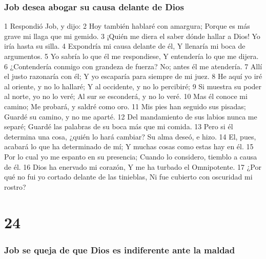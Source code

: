 \subsection*{Job desea abogar su causa delante de Dios}  

1 Respondió Job, y dijo:  
2 Hoy también hablaré con amargura;  
Porque es más grave mi llaga que mi gemido.  
3 ¡Quién me diera el saber dónde hallar a Dios!  
Yo iría hasta su silla.  
4 Expondría mi causa delante de él,  
Y llenaría mi boca de argumentos.  
5 Yo sabría lo que él me respondiese,  
Y entendería lo que me dijera.  
6 ¿Contendería conmigo con grandeza de fuerza? 
No; antes él me atendería.  
7 Allí el justo razonaría con él;  
Y yo escaparía para siempre de mi juez.  
8 He aquí yo iré al oriente, y no lo hallaré;  
Y al occidente, y no lo percibiré;  
9 Si muestra su poder al norte, yo no lo veré;  
Al sur se esconderá, y no lo veré.  
10 Mas él conoce mi camino;  
Me probará, y saldré como oro.  
11 Mis pies han seguido sus pisadas;  
Guardé su camino, y no me aparté.  
12 Del mandamiento de sus labios nunca me separé;  
Guardé las palabras de su boca más que mi comida.  
13 Pero si él determina una cosa, ¿quién lo hará cambiar?  
Su alma deseó, e hizo.  
14 El, pues, acabará lo que ha determinado de mí;  
Y muchas cosas como estas hay en él.  
15 Por lo cual yo me espanto en su presencia;  
Cuando lo considero, tiemblo a causa de él.  
16 Dios ha enervado mi corazón, 
Y me ha turbado el Omnipotente.  
17 ¿Por qué no fui yo cortado delante de las tinieblas,  
Ni fue cubierto con oscuridad mi rostro?  

\chapter{24}

\subsection*{Job se queja de que Dios es indiferente ante la maldad}  

